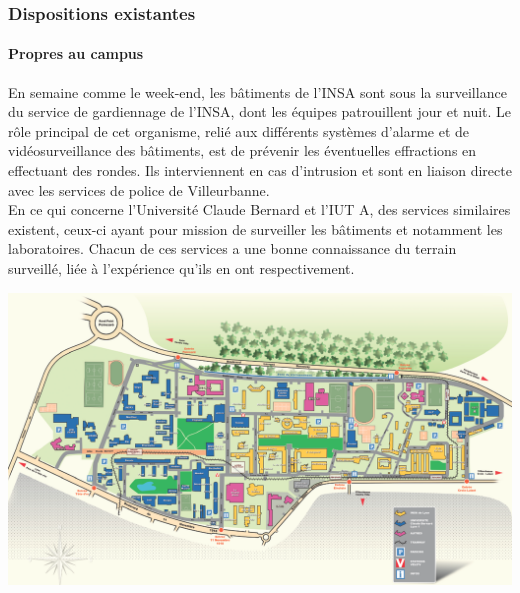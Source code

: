 \documentclass[hidelinks, paper=a4, fontsize=13pt]{report}
\begin{document}
\subsubsection{Dispositions existantes}
\paragraph{Propres au campus}
En semaine comme le week-end, les bâtiments de l’INSA sont sous la surveillance du service de gardiennage de l’INSA, dont les équipes patrouillent jour et nuit. Le rôle principal de cet organisme, relié aux différents systèmes d’alarme et de vidéosurveillance des bâtiments, est de prévenir les éventuelles effractions en effectuant des rondes. Ils interviennent en cas d’intrusion et sont en liaison directe avec les services de police de Villeurbanne. \\

En ce qui concerne l’Université Claude Bernard et l’IUT A, des services similaires existent, ceux-ci ayant pour mission de surveiller les bâtiments et notamment les laboratoires. Chacun de ces services a une bonne connaissance du terrain surveillé, liée à l’expérience qu’ils en ont respectivement.

\begin{center}
	\includegraphics[scale=0.85]{Annexes/Plans/planDeSituation}
\end{center}
\end{document}
